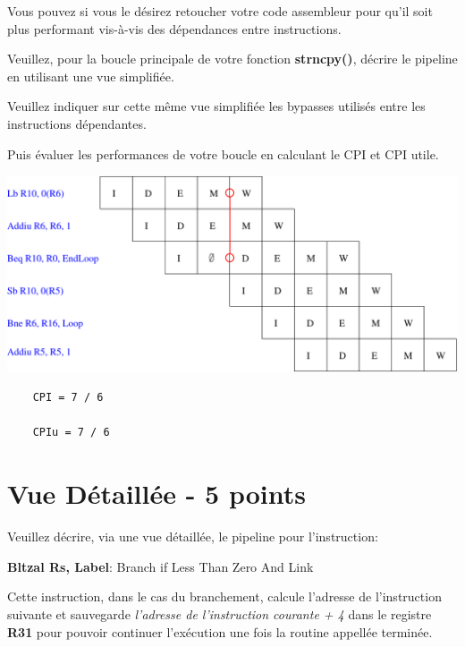 Vous pouvez si vous le d\'esirez retoucher votre code assembleur
pour qu'il soit plus performant vis-\`a-vis des d\'ependances entre
instructions.

Veuillez, pour la boucle principale de votre fonction \textbf{strncpy()},
d\'ecrire le pipeline en utilisant une vue simplifi\'ee.

Veuillez indiquer sur cette m\^eme vue simplifi\'ee les bypasses utilis\'es
entre les instructions d\'ependantes.

Puis \'evaluer les performances de votre boucle en calculant le CPI et CPI
utile.

\begin{correction}

  \begin{center}
    \includegraphics[scale=0.8]{figures/correction-vue-simplifiee.pdf}
  \end{center}

  \begin{verbatim}
    CPI = 7 / 6

    CPIu = 7 / 6
  \end{verbatim}

\end{correction}

%
%

\section{Vue D\'etaill\'ee - 5 points}

Veuillez d\'ecrire, via une vue d\'etaill\'ee, le pipeline pour l'instruction:

\textbf{Bltzal Rs, Label}: Branch if Less Than Zero And Link

Cette instruction, dans le cas du branchement, calcule l'adresse de
l'instruction suivante et sauvegarde \textit{l'adresse de l'instruction
courante + 4} dans le registre \textbf{R31} pour pouvoir continuer
l'ex\'ecution une fois la routine appell\'ee termin\'ee.

